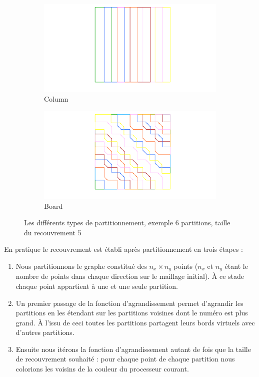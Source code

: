\documentclass[a4paper,11pt]{article}
\begin{document}
\begin{figure}[H]\ContinuedFloat
	\begin{subfigure}[b]{0.45\textwidth}
		\hspace{-2.5cm}
		\includegraphics[width=1.5\textwidth]{column_6.png}
		\caption{Column}
	\end{subfigure}
\hfill
	\begin{subfigure}[b]{0.45\textwidth}
		\hspace{-2.5cm}
		\includegraphics[width=1.5\textwidth]{board_6.png}
		\caption{Board}
	\end{subfigure}
	\caption{Les différents types de partitionnement, exemple 6 partitions, taille du recouvrement 5}
	\label{fig:typepartition}
\end{figure}
\noindent En pratique le recouvrement est établi après partitionnement en trois étapes :
\begin{enumerate}
	\item Nous partitionnons le graphe constitué des $n_x \times n_y$ points ($n_x$ et $n_y$ étant le nombre de points dans chaque direction sur le maillage initial).  À ce stade chaque point appartient à une et une seule partition.
	\item Un premier passage de la fonction d'agrandissement permet d'agrandir les partitions en les étendant sur les partitions voisines dont le numéro est plus grand. À l'issu de ceci toutes les partitions partagent leurs bords virtuels avec d'autres partitions.
	\item Ensuite nous itérons la fonction d'agrandissement autant de fois que la taille de recouvrement souhaité : pour chaque point de chaque partition nous colorions les voisins de la couleur du processeur courant.
\end{enumerate}
\end{document}
